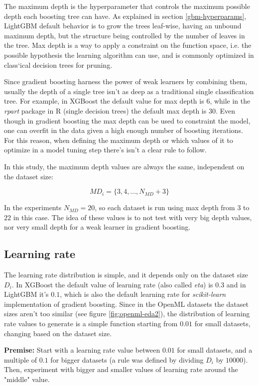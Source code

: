 The maximum depth is the hyperparameter that controls the maximum possible depth each boosting tree can have. As explained in section \ref{gbm-hyperparams}, LightGBM default behavior is to grow the trees leaf-wise, having an unbound maximum depth, but the structure being controlled by the number of leaves in the tree. Max depth is a way to apply a constraint on the function space, i.e. the possible hypothesis the learning algorithm can use, and is commonly optimized in class`ical decision trees for pruning. 

Since gradient boosting harness the power of weak learners by combining them, usually the depth of a single tree isn't as deep as a traditional single classification tree. For example, in XGBoost the default value for max depth is $6$, while in the \textit{rpart} package in R (single decision trees) the default max depth is $30$. Even though in gradient boosting the max depth can be used to constraint the model, one can overfit in the data given a high enough number of boosting iterations. For this reason, when defining the maximum depth or which values of it to optimize in a model tuning step there's isn't a clear rule to follow.

In this study, the maximum depth values are always the same, independent on the dataset size:

$$MD_i = \{3, 4, ..., N_{MD} + 3\}$$

In the experiments $N_{MD} = 20$, so each dataset is run using max depth from $3$ to $22$ in this case. The idea of these values is to not test with very big depth values, nor very small depth for a weak learner in gradient boosting.

\subsection{Learning rate}

The learning rate distribution is simple, and it depends only on the dataset size $D_i$. In XGBoost the default value of learning rate (also called \textit{eta}) is $0.3$ and in LightGBM it's $0.1$, which is also the default learning rate for \textit{scikit-learn} implementation of gradient boosting. Since in the OpenML datasets the dataset sizes aren't too similar (see figure \ref{fig:openml-eda2}), the distribution of learning rate values to generate is a simple function starting from $0.01$ for small datasets, changing based on the dataset size.

\textbf{Premise:} Start with a learning rate value between $0.01$ for small datasets, and a multiple of $0.1$ for bigger datasets (a rule was defined by dividing $D_i$ by $10000$). Then, experiment with bigger and smaller values of learning rate around the "middle" value.

